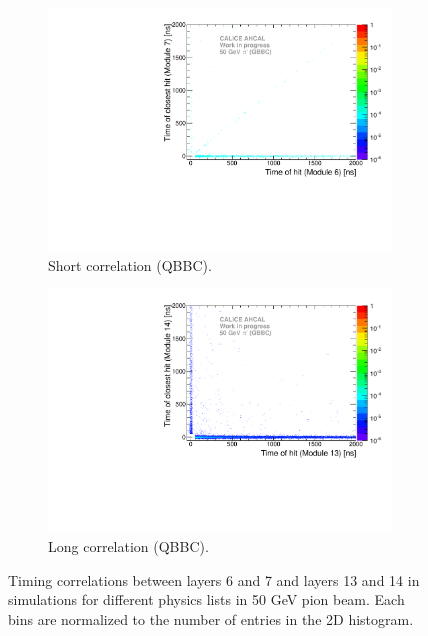 \begin{figure}[htbp!]
\begin{subfigure}[t]{0.5\textwidth}
    \centering
    \includegraphics[width=1\textwidth]{../Thesis_Plots/Timing/Pions/Plots/ComparisonToSim/Time_Correlation_50GeV_short_QBBC_DD4hep.pdf}
    \caption{Short correlation (QBBC).} \label{fig:Corr_short_QBBC_DD4hep}
  \end{subfigure}
  \hfill
  \begin{subfigure}[t]{0.5\textwidth}
    \centering
    \includegraphics[width=1\textwidth]{../Thesis_Plots/Timing/Pions/Plots/ComparisonToSim/Time_Correlation_50GeV_long_QBBC_DD4hep.pdf}
    \caption{Long correlation (QBBC).} \label{fig:Corr_long_QBBC_DD4hep}
  \end{subfigure}
  \caption{Timing correlations between layers 6 and 7 and layers 13 and 14 in \ddhep simulations for different physics lists in 50 GeV pion beam. Each bins are normalized to the number of entries in the 2D histogram.}
\end{figure}
